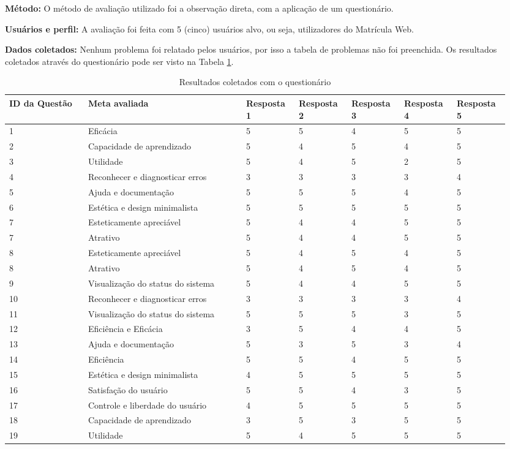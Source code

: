   \textbf{Método:}
  O método de avaliação utilizado foi a observação direta, com a aplicação de um questionário.

  \textbf{Usuários e perfil:}
  A avaliação foi feita com 5 (cinco) usuários alvo, ou seja, utilizadores do Matrícula Web.

  \textbf{Dados coletados:}
     Nenhum problema foi relatado pelos usuários, por isso a tabela de problemas não foi preenchida. Os resultados coletados
   através do questionário pode ser visto na Tabela \ref{tab:resultados2}.
   
\begin{table}[!h]
  \caption{Resultados coletados com o questionário}
  \label{tab:resultados2}
    \begin{tabular}{p{0.15\linewidth}p{0.30\linewidth}p{0.10\linewidth}p{0.10\linewidth}p{0.10\linewidth}p{0.10\linewidth}p{0.10\linewidth}}
  \hline
    ID da Questão & Meta avaliada & Resposta 1 & Resposta 2 & Resposta 3 & Resposta 4 & Resposta 5\\
  \hline
    1&Eficácia &5&5&4&5&5\\
     2&Capacidade de aprendizado &5&4&5&4&5\\
      3&Utilidade&5&4&5&2&5\\
      4&Reconhecer e diagnosticar erros&3&3&3&3&4\\
      5&Ajuda e documentação&5&5&5&4&5\\
      6&Estética e design minimalista&5&5&5&5&5\\
      7&Esteticamente apreciável&5&4&4&5&5\\
      7&Atrativo&5&4&4&5&5\\
       8&Esteticamente apreciável &5&4&5&4&5\\
        8&Atrativo&5&4&5&4&5\\
     9&Visualização do status do sistema &5&4&4&5&5\\
      10&Reconhecer e diagnosticar erros &3&3&3&3&4\\
      11&Visualização do status do sistema &5&5&5&3&5\\
      12&Eficiência e Eficácia &3&5&4&4&5\\
      13&Ajuda e documentação&5&3&5&3&4\\
      14&Eficiência&5&5&4&5&5\\
      15&Estética e design minimalista&4&5&5&5&5\\
      16&Satisfação do usuário&5&5&4&3&5\\
      17&Controle e liberdade do usuário&4&5&5&5&5\\
      18&Capacidade de aprendizado&3&5&3&5&5\\
      19&Utilidade&5&4&5&5&5\\

  \end{tabular}
\end{table}

